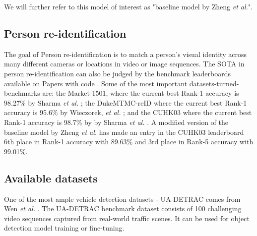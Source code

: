 \documentclass[conference]{IEEEtran} %
\begin{document}
		We will further refer to this model of interest as "baseline model by Zheng \textit{et al.}".
	
	\subsection{Person re-identification}
	
		The goal of Person re-identification is to match a person's visual identity across many different cameras or locations in video or image sequences. The SOTA in person re-identification can also be judged by the benchmark leaderboards available on Papers with code \cite{paperswithcode2024Persreid}. Some of the most important datasets-turned-benchmarks are: the Market-1501, where the current best Rank-1 accuracy is 98.27\% by Sharma \textit{et al.} \cite{sharma2021person}; the DukeMTMC-reID where the current best Rank-1 accuracy is 95.6\% by Wieczorek, \textit{et al.} \cite{wieczorek2021unreasonable}; and the CUHK03 where the current best Rank-1 accuracy is 98.7\% by by Sharma \textit{et al.} \cite{sharma2021person}. A modified version of the baseline model by Zheng \textit{et al.} has made an entry in the CUHK03 leaderboard 6th place in Rank-1 accuracy with 89.63\% and 3rd place in Rank-5 accuracy with 99.01\%.
		
	\subsection{Available datasets}
	\label{sec:available datasets}
	
		One of the most ample vehicle detection datasets - UA-DETRAC comes from Wen \textit{et al.}  \cite{wen2020ua}. The UA-DETRAC benchmark dataset consists of 100 challenging video sequences captured from real-world traffic scenes. It can be used for object detection model training or fine-tuning.
		
\end{document}
